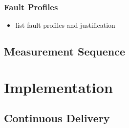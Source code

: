 \subsubsection{Fault Profiles}

\begin{itemize}
	\item list fault profiles and justification
\end{itemize}

\subsection{Measurement Sequence}

\section{Implementation}

\subsection{Continuous Delivery}
